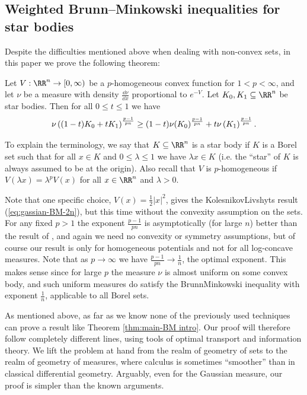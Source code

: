 \subsection{Weighted Brunn--Minkowski inequalities for star bodies}
Despite the difficulties mentioned above when dealing with non-convex sets, in this paper we prove the following theorem:
\begin{thm}
\label{thm:main-BM intro}Let $V:\RR^{n}\to[0,\infty)$ be a $p$-homogeneous
convex function for $1<p<\infty$, and let $\nu$ be a measure with
density $\frac{\dd\nu}{\dd x}$ proportional to $e^{-V}$. Let $K_{0},K_{1}\subseteq\RR^{n}$
be star bodies. Then for all $0\le t \le1$ we have
\begin{equation}
\text{\ensuremath{\nu\left((1-t)K_{0}+t K_{1}\right)^{\frac{p-1}{pn}}\ge(1-t)\nu(K_{0})^{\frac{p-1}{pn}}+ t \nu\left(K_{1}\right)^{\frac{p-1}{pn}}.}}
\end{equation} 
\end{thm}

To explain the terminology, we say that $K\subseteq\RR^{n}$ is a star
body if $K$ is a Borel set such that for all $x\in K$ and $0\le \lambda \le1$
we have $\lambda x\in K$ (i.e. the ``star'' of $K$ is always assumed
to be at the origin). Also recall that $V$ is $p$-homogeneous if
$V(\lambda x)=\lambda^{p}V(x)$ for all $x\in\RR^{n}$ and $\lambda>0$. 

Note that one specific choice, $V(x)=\frac{1}{2}\left|x\right|^{2}$,
gives the Kolesnikov\textendash Livshyts result (\eqref{eq:gassian-BM-2n}),
but this time without the convexity assumption on the sets. For any
fixed $p>1$ the exponent $\frac{p-1}{pn}$ is asymptotically (for
large $n$) better than the result of \cite{Livshyts23}, and again
we need no convexity or symmetry assumptions, but of course our result
is only for homogeneous potentials and not for all log-concave measures.
Note that as $p\to\infty$ we have $\frac{p-1}{pn}\to\frac{1}{n}$,
the optimal exponent. This makes sense since for large $p$ the measure
$\nu$ is almost uniform on some convex body, and such uniform measures
do satisfy the Brunn\textendash Minkowski inequality with exponent
$\frac{1}{n}$, applicable to all Borel sets. 

As mentioned above, as far as we know none of the previously used
techniques can prove a result like Theorem \ref{thm:main-BM intro}. Our
proof will therefore follow completely different lines, using tools
of optimal transport and information theory. We lift the problem at hand from the realm of geometry of sets to the realm of geometry of measures, where calculus is sometimes ``smoother'' than in classical differential geometry. Arguably, even for the Gaussian measure, our proof is simpler than the known arguments.

